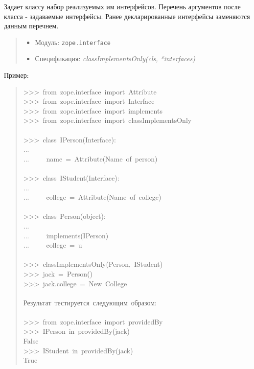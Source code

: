 \documentclass[14pt,a4paper,openany,twoside,final]{extbook}
\providecommand*{\DUroletitlereference}[1]{\textsl{#1}}
\begin{document}
Задает классу набор реализуемых им интерфейсов.  Перечень аргументов
после класса - задаваемые интерфейсы.  Ранее декларированные
интерфейсы заменяются данным перечнем.

\begin{quote}

\begin{itemize}

\item Модуль: \texttt{zope.interface}

\item Спецификация: \DUroletitlereference{classImplementsOnly(cls, *interfaces)}

\end{itemize}

\end{quote}

Пример:

\begin{quote}{\ttfamily \raggedright \noindent
>{}>{}>~from~zope.interface~import~Attribute\\
>{}>{}>~from~zope.interface~import~Interface\\
>{}>{}>~from~zope.interface~import~implements\\
>{}>{}>~from~zope.interface~import~classImplementsOnly\\
~\\
>{}>{}>~class~IPerson(Interface):\\
...\\
...~~~~~name~=~Attribute(\textquotedbl{}Name~of~person\textquotedbl{})\\
~\\
>{}>{}>~class~IStudent(Interface):\\
...\\
...~~~~~college~=~Attribute(\textquotedbl{}Name~of~college\textquotedbl{})\\
~\\
>{}>{}>~class~Person(object):\\
...\\
...~~~~~implements(IPerson)\\
...~~~~~college~=~u\textquotedbl{}\textquotedbl{}\\
~\\
>{}>{}>~classImplementsOnly(Person,~IStudent)\\
>{}>{}>~jack~=~Person()\\
>{}>{}>~jack.college~=~\textquotedbl{}New~College\textquotedbl{}\\
~\\
Результат~тестируется~следующим~образом:\\
~\\
>{}>{}>~from~zope.interface~import~providedBy\\
>{}>{}>~IPerson~in~providedBy(jack)\\
False\\
>{}>{}>~IStudent~in~providedBy(jack)\\
True
}
\end{quote}
\end{document}
